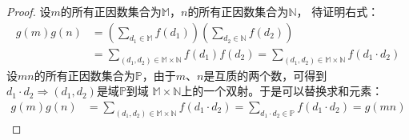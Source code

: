 \begin{proof}设$m$的所有正因数集合为$\mathbb{M}$，$n$的所有正因数集合为$\mathbb{N}$，
    待证明右式：
    \begin{align*}
        g(m)g(n)&=\left(\sum_{d_1\in \mathbb{M}}f(d_1)\right)\left(\sum_{d_2\in \mathbb{N}}f(d_2)\right)\\
        &=\sum_{(d_1,d_2)\in \mathbb{M}\times\mathbb{N}}f(d_1)f(d_2)=\sum_{(d_1,d_2)\in \mathbb{M}\times\mathbb{N}}f(d_1\cdot d_2)
    \end{align*}
    设$mn$的所有正因数集合为$\mathbb{P}$，由于$m$、$n$是互质的两个数，可得到$d_1\cdot d_2\Longrightarrow (d_1, d_2)$是域$\mathbb{P}$到域
    $\mathbb{M}\times\mathbb{N}$上的一个双射。于是可以替换求和元素：
    \begin{align*}
        g(m)g(n)&=\sum_{(d_1,d_2)\in \mathbb{M}\times\mathbb{N}}f(d_1\cdot d_2)=\sum_{d_1\cdot d_2 \in\mathbb{P}}f(d_1\cdot d_2)=g(mn)
    \end{align*}
\end{proof}